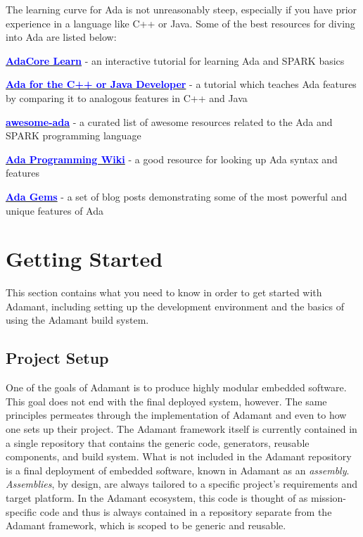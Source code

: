 The learning curve for Ada is not unreasonably steep, especially if you have prior experience in a language like C++ or Java. Some of the best resources for diving into Ada are listed below:

\vspace{5mm} %
\begin{spaceditemize}
  \item \href{https://learn.adacore.com/index.html}{\textbf{\textcolor{blue}{AdaCore Learn}}} - an interactive tutorial for learning Ada and SPARK basics
  \item \href{https://learn.adacore.com/courses/Ada_For_The_CPP_Java_Developer/index.html}{\textbf{\textcolor{blue}{Ada for the C++ or Java Developer}}} - a tutorial which teaches Ada features by comparing it to analogous features in C++ and Java
  \item \href{https://github.com/ohenley/awesome-ada}{\textbf{\textcolor{blue}{awesome-ada}}} - a curated list of awesome resources related to the Ada and SPARK programming language
  \item \href{https://en.wikibooks.org/wiki/Ada_Programming}{\textbf{\textcolor{blue}{Ada Programming Wiki}}} - a good resource for looking up Ada syntax and features
  \item \href{https://www.adacore.com/gems/}{\textbf{\textcolor{blue}{Ada Gems}}} - a set of blog posts demonstrating some of the most powerful and unique features of Ada
\end{spaceditemize}
\vspace{5mm} %

\newpage
\section{Getting Started} \label{Getting Started}

This section contains what you need to know in order to get started with Adamant, including setting up the development environment and the basics of using the Adamant build system.

\subsection{Project Setup} \label{Project Setup}

One of the goals of Adamant is to produce highly modular embedded software. This goal does not end with the final deployed system, however. The same principles permeates through the implementation of Adamant and even to how one sets up their project. The Adamant framework itself is currently contained in a single repository that contains the generic code, generators, reusable components, and build system. What is not included in the Adamant repository is a final deployment of embedded software, known in Adamant as an \textit{assembly}. \textit{Assemblies}, by design, are always tailored to a specific project's requirements and target platform. In the Adamant ecosystem, this code is thought of as mission-specific code and thus is always contained in a repository separate from the Adamant framework, which is scoped to be generic and reusable. \\

